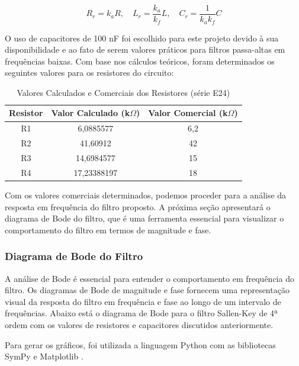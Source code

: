 \documentclass[
	12pt,				%
	openright,			%
	twoside,			%
	a4paper,			%
	english,			%
	french,				%
	spanish,			%
	brazil,				%
	]{abntex2}
\begin{document}
\begin{equation}
R_r = k_a R, \quad L_r = \frac{k_a}{k_f} L, \quad C_r = \frac{1}{k_a k_f} C
\end{equation}

O uso de capacitores de 100 nF foi escolhido para este projeto devido à sua disponibilidade e ao fato de serem valores práticos para filtros passa-altas em frequências baixas. Com base nos cálculos teóricos, foram determinados os seguintes valores para os resistores do circuito:

\begin{table}[H]
\centering
\caption{Valores Calculados e Comerciais dos Resistores (série E24)}
\begin{tabular}{|c|c|c|}
\hline
\textbf{Resistor} & \textbf{Valor Calculado (k$\Omega$)} & \textbf{Valor Comercial (k$\Omega$)} \\ \hline
R1 & 6,0885577 & 6,2 \\ \hline
R2 & 41,60912 & 42 \\ \hline
R3 & 14,6984577 & 15 \\ \hline
R4 & 17,23388197 & 18 \\ \hline
\end{tabular}
\label{tab:resistor_values}
\end{table}

Com os valores comerciais determinados, podemos proceder para a análise da resposta em frequência do filtro proposto. A próxima seção apresentará o diagrama de Bode do filtro, que é uma ferramenta essencial para visualizar o comportamento do filtro em termos de magnitude e fase.


\subsubsection{Diagrama de Bode do Filtro}
A análise de Bode é essencial para entender o comportamento em frequência do filtro. Os diagramas de Bode de magnitude e fase fornecem uma representação visual da resposta do filtro em frequência e fase ao longo de um intervalo de frequências. Abaixo está o diagrama de Bode para o filtro Sallen-Key de 4ª ordem com os valores de resistores e capacitores discutidos anteriormente.

Para gerar os gráficos, foi utilizada a linguagem Python \cite{python} com as bibliotecas SymPy \cite{sympy} e Matplotlib \cite{matplotlib}.
\end{document}
